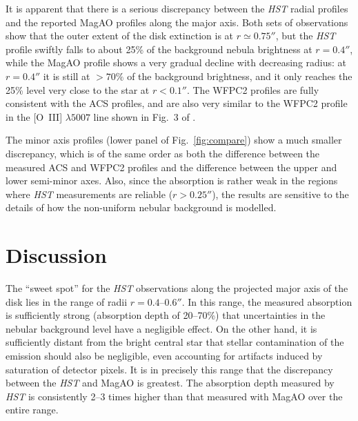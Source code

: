 \documentclass[oneside, 11pt]{article}
\begin{document}
It is apparent that there is a serious discrepancy between the \emph{HST} radial profiles and the reported MagAO profiles along the major axis.   Both sets of observations show that the outer extent of the disk extinction is at \(r \simeq 0.75''\), but the \emph{HST} profile swiftly falls to about 25\% of the background nebula brightness at \(r = 0.4''\), while the MagAO profile shows a very gradual decline with decreasing radius: at \(r = 0.4''\) it is still at \(> 70\%\) of the background brightness, and it only reaches the 25\% level very close to the star at \(r < 0.1''\).    The WFPC2 profiles are fully consistent with the ACS profiles, and are also very similar to the WFPC2 profile in the [O~III] \(\lambda 5007\) line shown in Fig.~3 of \citet{McCaughrean:1996a}. 

The minor axis profiles (lower panel of Fig.~\ref{fig:compare}) show a much smaller discrepancy, which is of the same order as both the difference between the measured ACS and WFPC2 profiles and the difference between the upper and lower semi-minor axes.   Also, since the absorption is rather weak in the regions  where \textit{HST} measurements are reliable (\(r > 0.25''\)), the results are sensitive to the details of how the non-uniform nebular background is modelled. 


\section{Discussion}
\label{sec:discuss}

The ``sweet spot'' for the \textit{HST} observations along the projected major axis of the disk lies in the range of radii \(r = 0.4\)--\(0.6''\).  In this range, the measured absorption is sufficiently strong (absorption depth of 20--70\%) that uncertainties in the nebular background level have a negligible effect.  On the other hand, it is sufficiently distant from the bright central star that stellar contamination of the emission should also be negligible, even accounting for artifacts induced by saturation of detector pixels.   It is in precisely this range that the discrepancy between the \textit{HST} and \hbox{MagAO} is greatest.  The absorption depth measured by \textit{HST} is consistently 2--3 times higher than that measured with MagAO over the entire range. 
\end{document}
